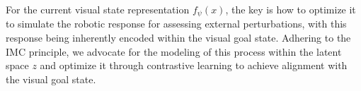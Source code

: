 For the current visual state representation $f_{\psi}(x)$, the key is how to optimize it to simulate the robotic response for assessing external perturbations, with this response being inherently encoded within the visual goal state.
Adhering to the IMC principle, we advocate for the modeling of this process within the latent space $z$ and optimize it through contrastive learning to achieve alignment with the visual goal state.


